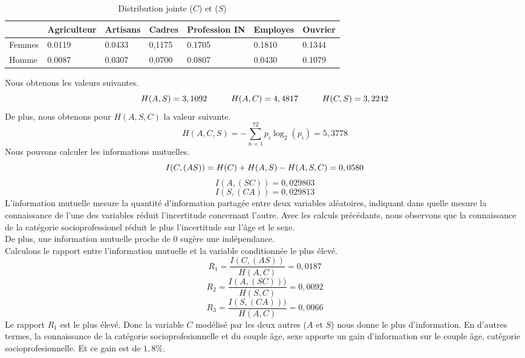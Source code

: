\documentclass{article}
\begin{document}
\begin{table}[H]
  \centering
  \caption{Distribution jointe ($C$) et ($S$)}
  \begin{tabular}{|l|l|l|l|l|l|l|}
  \hline
         & Agriculteur & Artisans & Cadres & Profession IN & Employes & Ouvrier \\ \hline
    Femmes & 0.0119      & 0.0433   & 0,1175 & 0.1705        & 0.1810   & 0.1344  \\ \hline
    Homme  & 0.0087      & 0.0307   & 0,0700 & 0.0807        & 0.0430   & 0.1079  \\ \hline
    \end{tabular}
\end{table}
Nous obtenons les valeurs suivantes.
\[
H(A,S)=3,1092 \hspace{1 cm} H(A,C)= 4,4817 \hspace{1cm} H(C,S)=3,2242
\]
De plus, nous obtenons pour $H(A,S,C)$ la valeur suivante.
\[
  H(A,C,S) = -\sum_{n = 1}^{72}p_i\log_2(p_i)=5,3778
\]
Nous pouvons calculer les informations mutuelles.
\[
I(C,(AS))=H(C)+H(A,S)-H(A,S,C) = 0,0580 \\
\]
\[
I(A,(SC))= 0,029803
\]
\[
I(S,(CA))=0,029813
\]
L’information mutuelle mesure la quantité d’information partagée entre deux variables aléatoires, indiquant dans quelle mesure la connaissance de l’une des variables réduit l’incertitude concernant l’autre. 
Avec les calculs précédants, nous observons que la connaissance de la catégorie socioprofessionel réduit le plus l'incertitude sur l'âge et le sexe.\\
De plus, une information mutuelle proche de 0 sugère une indépendance.\\
Calculons le rapport entre l'information mutuelle et la variable conditionnée le plus élevé.
\[
R_1 = \frac{I(C,(AS))}{H(A,C)}=0,0187
\]
\[
R_2 = \frac{I(A,(SC)))}{H(S,C)}=0,0092
\]
\[
R_3 = \frac{I(S,(CA)))}{H(A,C)}=0,0066
\]
Le rapport $R_1$ est le plus élevé. Donc la variable $C$ modélisé par les deux autres ($A$ et $S$) nous donne le plus d'information.
En d'autres termes, la connaissance de la catégorie socioprofesionnelle et du couple âge, sexe apporte un gain d'information sur le couple âge, catégorie socioprofesionnelle. Et ce gain est de $1,8\%$.
\end{document}
